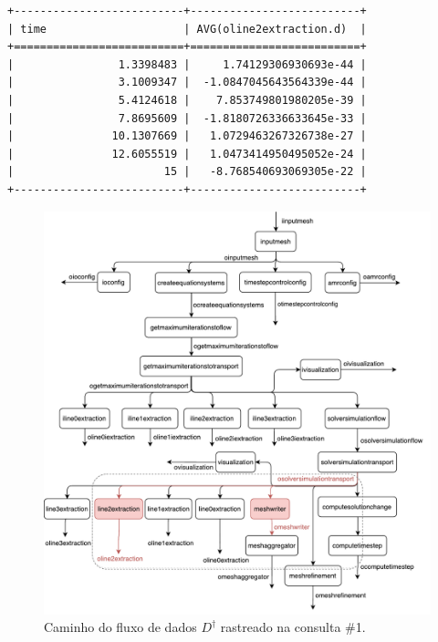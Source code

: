 \begin{center}
\begin{lstlisting}[language=sqlresults,label={lst:experiments-1-sqlresults},caption={[Resultados da consulta \#1.]Resultados da consulta \#1. Tempo médio de execução: 4,35~ms.}]
+--------------------------+--------------------------+
| time                     | AVG(oline2extraction.d)  |
+==========================+==========================+
|                1.3398483 |     1.74129306930693e-44 |
|                3.1009347 |  -1.0847045643564339e-44 |
|                5.4124618 |    7.853749801980205e-39 |
|                7.8695609 |  -1.8180726336633645e-33 |
|               10.1307669 |   1.0729463267326738e-27 |
|               12.6055519 |   1.0473414950495052e-24 |
|                       15 |   -8.768540693069305e-22 |
+--------------------------+--------------------------+
\end{lstlisting}
\end{center}

\begin{figure}[htb]
    \centering
    \includegraphics[width=\textwidth]{img/experiments-dataflow-1}
    \caption[Caminho do fluxo de dados \(D^{\dagger}\) rastreado na consulta \#1]{Caminho do fluxo de dados \(D^{\dagger}\) rastreado na consulta \#1.}%
    \label{fig:experiments-dataflow-1}
\end{figure}

